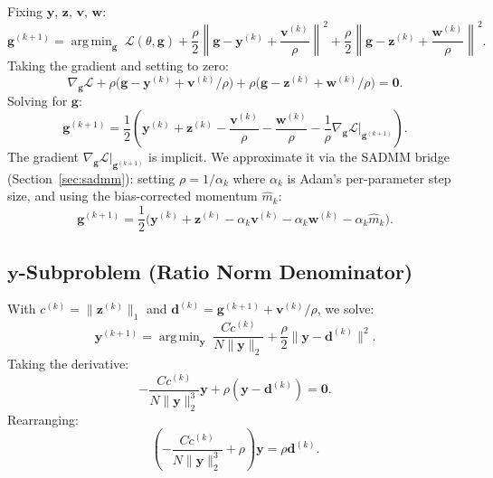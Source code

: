 \documentclass{uai2026} %
\theoremstyle{definition}
\theoremstyle{remark}
\newcommand{\bz}{\mathbf{z}}
\newcommand{\bg}{\mathbf{g}}
\newcommand{\bv}{\mathbf{v}}
\newcommand{\bw}{\mathbf{w}}
\newcommand{\by}{\mathbf{y}}
\newcommand{\bd}{\mathbf{d}}
\DeclareMathOperator*{\argmin}{arg\,min}
\begin{document}
Fixing $\by$, $\bz$, $\bv$, $\bw$:
\begin{equation}
    \bg^{(k+1)} = \argmin_{\bg}\;\mathcal{L}(\theta,\bg)
    + \frac{\rho}{2}\left\lVert\bg - \by^{(k)} + \frac{\bv^{(k)}}{\rho}\right\rVert^2
    + \frac{\rho}{2}\left\lVert\bg - \bz^{(k)} + \frac{\bw^{(k)}}{\rho}\right\rVert^2.
\end{equation}
Taking the gradient and setting to zero:
\begin{equation}
    \nabla_{\bg}\mathcal{L} + \rho\bigl(\bg - \by^{(k)} + \bv^{(k)}/\rho\bigr)
    + \rho\bigl(\bg - \bz^{(k)} + \bw^{(k)}/\rho\bigr) = \mathbf{0}.
\end{equation}
Solving for $\bg$:
\begin{equation}
    \bg^{(k+1)} = \frac{1}{2}\left(\by^{(k)} + \bz^{(k)}
    - \frac{\bv^{(k)}}{\rho} - \frac{\bw^{(k)}}{\rho}
    - \frac{1}{\rho}\nabla_{\bg}\mathcal{L}\big|_{\bg^{(k+1)}}\right).
\end{equation}
The gradient $\nabla_{\bg}\mathcal{L}|_{\bg^{(k+1)}}$ is implicit.
We approximate it via the SADMM bridge (Section~\ref{sec:sadmm}): setting $\rho = 1/\alpha_k$ where $\alpha_k$ is Adam's per-parameter step size, and using the bias-corrected momentum $\hat{m}_k$:
\begin{equation}
    \bg^{(k+1)} = \frac{1}{2}\bigl(\by^{(k)} + \bz^{(k)}
    - \alpha_k\bv^{(k)} - \alpha_k\bw^{(k)} - \alpha_k\hat{m}_k\bigr).
\end{equation}

\subsection{$\by$-Subproblem (Ratio Norm Denominator)}

With $c^{(k)} = \lVert\bz^{(k)}\rVert_1$ and $\bd^{(k)} = \bg^{(k+1)} + \bv^{(k)}/\rho$, we solve:
\begin{equation}
    \by^{(k+1)} = \argmin_{\by}\;\frac{Cc^{(k)}}{N\lVert\by\rVert_2}
    + \frac{\rho}{2}\lVert\by - \bd^{(k)}\rVert^2.
\end{equation}
Taking the derivative:
\begin{equation}
    -\frac{Cc^{(k)}}{N\lVert\by\rVert_2^3}\by + \rho(\by - \bd^{(k)}) = \mathbf{0}.
\end{equation}
Rearranging:
\begin{equation}
    \left(-\frac{Cc^{(k)}}{N\lVert\by\rVert_2^3} + \rho\right)\by = \rho\bd^{(k)}.
\end{equation}
\end{document}
